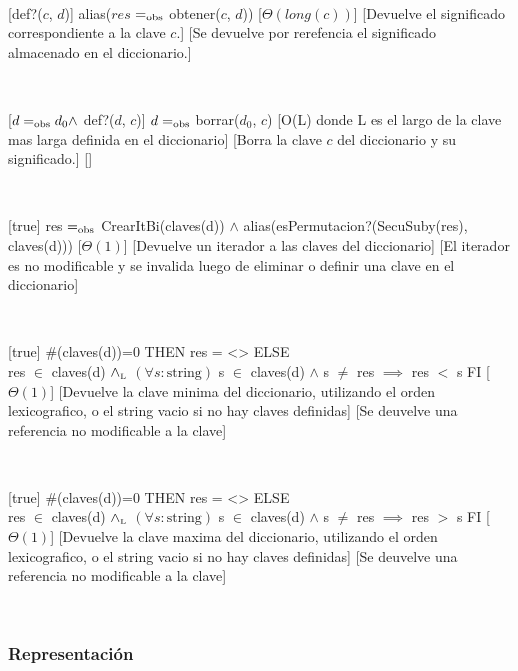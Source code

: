 ~

[def?($c$, $d$)]
{alias($res$ $=_{\mathrm{obs}}$ obtener($c$, $d$))}
[$\Theta(long(c))$]
[Devuelve el significado correspondiente a la clave $c$.]
[Se devuelve por rerefencia el significado almacenado en el diccionario.]

~

[$ d =_{\mathrm{obs}} d_0 \land $ def?($d$, $c$)]
{$ d =_{\mathrm{obs}}$ borrar($d_0$, $c$)}
[O(L) donde L es el largo de la clave mas larga definida en el diccionario]
[Borra la clave $c$ del diccionario y su significado.]
[]

~

[true]
{res $=_{\mathrm{obs}}$ CrearItBi(claves(d)) $\land$ alias(esPermutacion?(SecuSuby(res), claves(d)))}
[$\Theta(1)$]
[Devuelve un iterador a las claves del diccionario]
[El iterador es no modificable y se invalida luego de eliminar o definir una clave en el diccionario]

~

[true]
{\IF \#(claves(d))=0 THEN res = <> ELSE \\
 res $\in$ claves(d) $\land_{\mathrm{\scriptscriptstyle{L}}}$  $(\forall s:\text{string})$ s $\in$ claves(d) $\land$ s $\neq$ res $\implies$ res $<$ s  FI}
[$\Theta(1)$]
[Devuelve la clave minima del diccionario, utilizando el orden lexicografico, o el string vacio si no hay claves definidas]
[Se deuvelve una referencia no modificable a la clave]

~

[true]
{\IF \#(claves(d))=0 THEN res = <> ELSE \\
 res $\in$ claves(d) $\land_{\mathrm{\scriptscriptstyle{L}}}$  $(\forall s:\text{string})$ s $\in$ claves(d) $\land$ s $\neq$ res $\implies$ res $>$ s  FI}
[$\Theta(1)$]
[Devuelve la clave maxima del diccionario, utilizando el orden lexicografico, o el string vacio si no hay claves definidas]
[Se deuvelve una referencia no modificable a la clave]

~



\pagebreak

\subsubsection{Representación}

